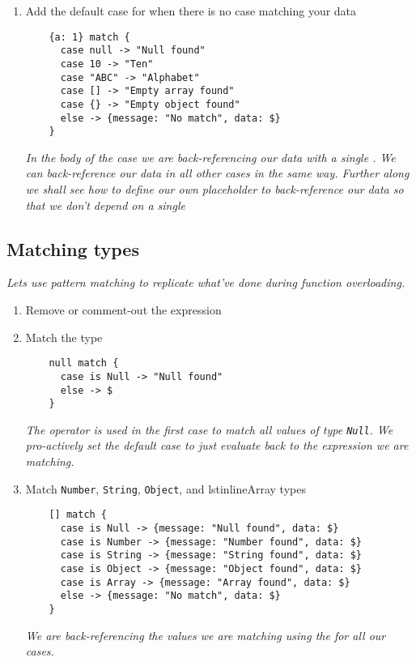 \begin{enumerate}
\begin{lstlisting}
      case 10 -> "Ten"
      case "ABC" -> "Alphabet"
      case [] -> "Empty array found"
      case {} -> "Empty object found"
    }
  \end{lstlisting}
  \emph{
    We are getting errors because there is no case matching this expression.
  }
  \newline
  \emph{
    There is no way to match inner data of objects and arrays directly in a case--i.e. adding inner data at the case level will only result in syntax errors.
  }
\item Add the default case for when there is no case matching your data
  \begin{lstlisting}
    {a: 1} match {
      case null -> "Null found"
      case 10 -> "Ten"
      case "ABC" -> "Alphabet"
      case [] -> "Empty array found"
      case {} -> "Empty object found"
      else -> {message: "No match", data: $}
    }
  \end{lstlisting}
  \emph{
    In the body of the  case we are back-referencing our data with a single \ttt{\$}.  We can back-reference our data in all other cases in the same way.  Further along we shall see how to define our own placeholder to back-reference our data so that we don't depend on a single \ttt{\$}
  }
\end{enumerate}

\subsection{Matching types}
\emph{
  Lets use pattern matching to replicate what've done during function overloading.
}
\begin{enumerate}[resume*]
\item Remove or comment-out the expression
\item Match the  type
  \begin{lstlisting}
    null match {
      case is Null -> "Null found"
      else -> $
    }
  \end{lstlisting}
  \emph{
    The  operator is used in the first case to match all values of type \lstinline{Null}.
  }
  \newline
  \emph{
    We pro-actively set the default case to just evaluate back to the expression we are matching.
  }
\item Match \lstinline{Number}, \lstinline{String}, \lstinline{Object}, and lstinline{Array} types
  \begin{lstlisting}
    [] match {
      case is Null -> {message: "Null found", data: $}
      case is Number -> {message: "Number found", data: $}
      case is String -> {message: "String found", data: $}
      case is Object -> {message: "Object found", data: $}
      case is Array -> {message: "Array found", data: $}
      else -> {message: "No match", data: $}
    }
  \end{lstlisting}
  \emph{
    We are back-referencing the values we are matching using the \ttt{\$} for all our cases.
  }
\end{enumerate}

